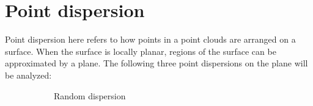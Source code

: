 \section{Point dispersion}
Point dispersion here refers to how points in a point clouds are arranged on a surface. When the surface is locally planar, regions of the surface can be approximated by a plane. The following three point dispersions on the plane will be analyzed:
\begin{figure}[H]
\centering
\hspace*{\fill}%
\begin{subfigure}{.3\textwidth}
{
	\setlength{\fboxsep}{0pt}%
	\setlength{\fboxrule}{0.5pt}%
	\caption{Random dispersion}
}
\end{subfigure}%
\hfill%
\begin{subfigure}{.3\textwidth}
{
	\setlength{\fboxsep}{0pt}%
	\setlength{\fboxrule}{0.5pt}%
}
\end{subfigure}
\end{figure}
